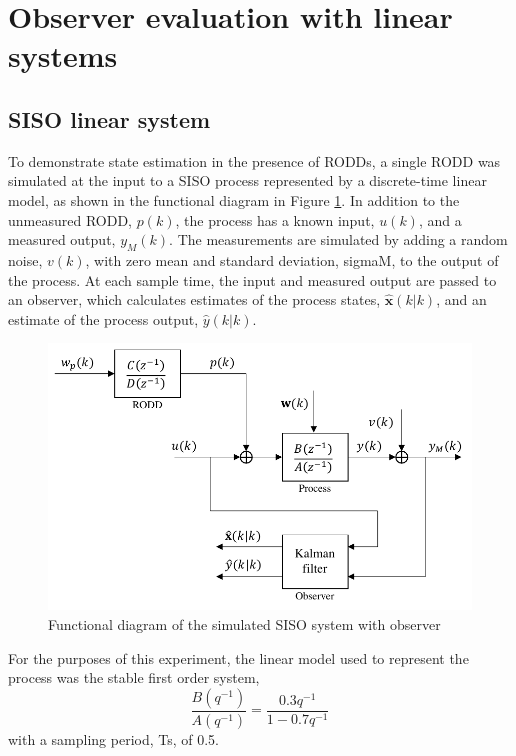 \section{Observer evaluation with linear systems} \label{sec:sim-obs-lin}

\subsection{SISO linear system} \label{sim-obs-lin-1}

To demonstrate state estimation in the presence of \gls{RODD}s, a single \gls{RODD} was simulated at the input to a SISO process represented by a discrete-time linear model, as shown in the functional diagram in Figure \ref{fig:sim-sys-diag-siso}. In addition to the unmeasured \gls{RODD}, $p(k)$, the process has a known input, $u(k)$, and a measured output, $y_M(k)$. The measurements are simulated by adding a random noise, $v(k)$, with zero mean and standard deviation, \gls{sigmaM}, to the output of the process. At each sample time, the input and measured output are passed to an observer, which calculates estimates of the process states, $\hat{\mathbf{x}}(k|k)$, and an estimate of the process output, $\hat{y}(k|k)$.
\begin{figure}[htp]
	\centering
	\includegraphics[width=11.5cm]{images/sim-sys-diag-siso.pdf}
	\caption{Functional diagram of the simulated SISO system with observer}
	\label{fig:sim-sys-diag-siso}
\end{figure}

For the purposes of this experiment, the linear model used to represent the process was the stable first order system,
\begin{equation}
	\frac{B(q^{-1})}{A(q^{-1})} = \frac{0.3q^{-1}}{1-0.7q^{-1}}
\end{equation}
with a sampling period, \gls{Ts}, of 0.5.

